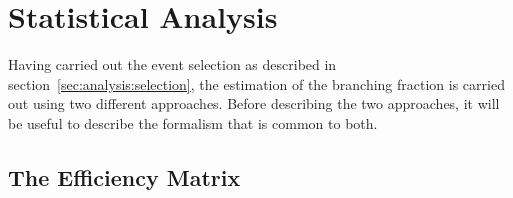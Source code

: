 \section{Statistical Analysis}
\label{sec:analysis:method}



Having carried out the event selection as described in section~\ref{sec:analysis:selection}, the estimation of the \PW branching fraction is carried out using two different approaches.  Before describing the two approaches, it will be useful to describe the formalism that is common to both.



\subsection{The Efficiency Matrix}
\label{sec:analysis:method:effMatrix}


